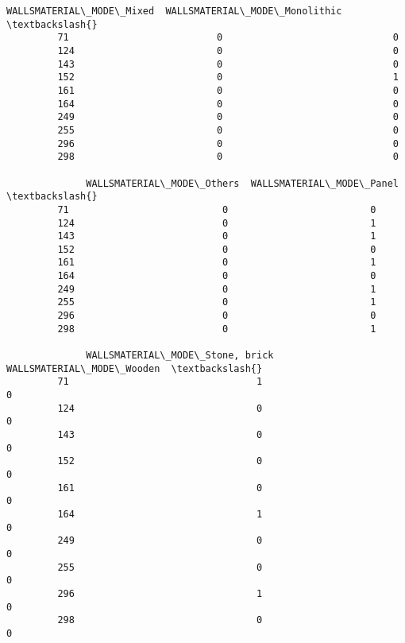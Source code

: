 \documentclass[11pt]{article}
\begin{document}
\begin{Verbatim}[commandchars=\\\{\}]
              WALLSMATERIAL\_MODE\_Mixed  WALLSMATERIAL\_MODE\_Monolithic  \textbackslash{}
         71                          0                              0   
         124                         0                              0   
         143                         0                              0   
         152                         0                              1   
         161                         0                              0   
         164                         0                              0   
         249                         0                              0   
         255                         0                              0   
         296                         0                              0   
         298                         0                              0   
         
              WALLSMATERIAL\_MODE\_Others  WALLSMATERIAL\_MODE\_Panel  \textbackslash{}
         71                           0                         0   
         124                          0                         1   
         143                          0                         1   
         152                          0                         0   
         161                          0                         1   
         164                          0                         0   
         249                          0                         1   
         255                          0                         1   
         296                          0                         0   
         298                          0                         1   
         
              WALLSMATERIAL\_MODE\_Stone, brick  WALLSMATERIAL\_MODE\_Wooden  \textbackslash{}
         71                                 1                          0   
         124                                0                          0   
         143                                0                          0   
         152                                0                          0   
         161                                0                          0   
         164                                1                          0   
         249                                0                          0   
         255                                0                          0   
         296                                1                          0   
         298                                0                          0   
         

\end{Verbatim}
\end{document}
